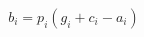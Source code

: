 \documentclass[12pt]{standalone}
\begin{document}
   \begin{varwidth}{50in}
        \begin{equation*}
            b_{i} = p_{i}(g_{i} + c_{i} - a_{i})
        \end{equation*}
    \end{varwidth}
\end{document}
